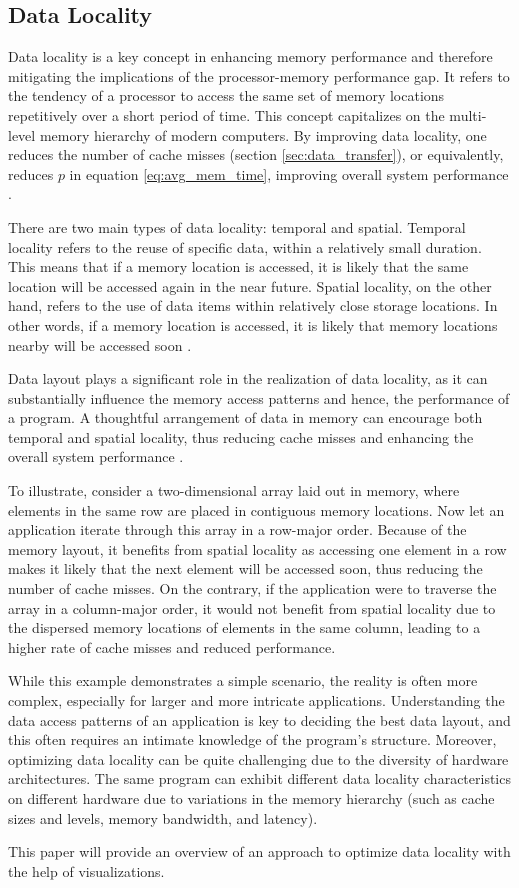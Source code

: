 \subsection{Data Locality}\label{sec:data_locality}
Data locality is a key concept in enhancing memory performance and therefore mitigating the implications of the processor-memory performance gap. It refers to the tendency of a processor to access the same set of memory locations repetitively over a short period of time. This concept capitalizes on the multi-level memory hierarchy of modern computers. By improving data locality, one reduces the number of cache misses (section \ref{sec:data_transfer}), or equivalently, reduces $p$ in equation \ref{eq:avg_mem_time}, improving overall system performance \cite{unat2017trends, tate2014programming}.

There are two main types of data locality: temporal and spatial. Temporal locality refers to the reuse of specific data, within a relatively small duration. This means that if a memory location is accessed, it is likely that the same location will be accessed again in the near future. Spatial locality, on the other hand, refers to the use of data items within relatively close storage locations. In other words, if a memory location is accessed, it is likely that memory locations nearby will be accessed soon \cite{esseghir1993improving}.

Data layout plays a significant role in the realization of data locality, as it can substantially influence the memory access patterns and hence, the performance of a program. A thoughtful arrangement of data in memory can encourage both temporal and spatial locality, thus reducing cache misses and enhancing the overall system performance \cite{esseghir1993improving}.

To illustrate, consider a two-dimensional array laid out in memory, where elements in the same row are placed in contiguous memory locations. Now let an application iterate through this array in a row-major order. Because of the memory layout, it benefits from spatial locality as accessing one element in a row makes it likely that the next element will be accessed soon, thus reducing the number of cache misses. On the contrary, if the application were to traverse the array in a column-major order, it would not benefit from spatial locality due to the dispersed memory locations of elements in the same column, leading to a higher rate of cache misses and reduced performance.

While this example demonstrates a simple scenario, the reality is often more complex, especially for larger and more intricate applications. Understanding the data access patterns of an application is key to deciding the best data layout, and this often requires an intimate knowledge of the program's structure. Moreover, optimizing data locality can be quite challenging due to the diversity of hardware architectures. The same program can exhibit different data locality characteristics on different hardware due to variations in the memory hierarchy (such as cache sizes and levels, memory bandwidth, and latency).

This paper will provide an overview of an approach to optimize data locality with the help of visualizations.
